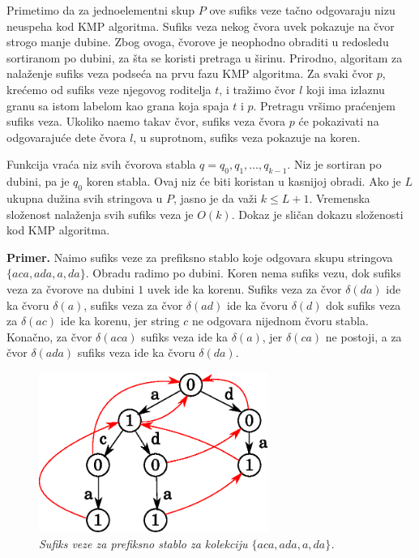 Primetimo da za jednoelementni skup $P$ ove sufiks veze ta\v cno odgovaraju nizu neuspeha kod KMP algoritma. Sufiks veza nekog \v cvora uvek pokazuje na \v cvor strogo manje dubine. Zbog ovoga, \v cvorove je neophodno obraditi u redosledu sortiranom po dubini, za \v sta se koristi pretraga u \v sirinu. Prirodno, algoritam za nala\v zenje sufiks veza podse\' ca na prvu fazu KMP algoritma. Za svaki \v cvor $p$, kre\' cemo od sufiks veze njegovog roditelja $t$, i tra\v zimo \v cvor $l$ koji ima izlaznu granu sa istom labelom kao grana koja spaja $t$ i $p$. Pretragu vr\v simo pra\' cenjem sufiks veza. Ukoliko na\dj emo takav \v cvor, sufiks veza \v cvora $p$ \' ce pokazivati na odgovaraju\' ce dete \v cvora $l$, u suprotnom, sufiks veza pokazuje na koren.

\noindent
\begin{minipage}[l]{\textwidth}

\end{minipage}

Funkcija vra\' ca niz svih \v cvorova stabla $q = q_0, q_1, \ldots, q_{k-1}$. Niz je sortiran po dubini, pa je $q_0$ koren stabla. Ovaj niz \' ce biti koristan u kasnijoj obradi. Ako je $L$ ukupna du\v zina svih stringova u $P$, jasno je da va\v zi $k \leq L+1$. Vremenska slo\v zenost nala\v zenja svih sufiks veza je $O(k)$\cite{ahorad}. Dokaz je sli\v can dokazu slo\v zenosti kod KMP algoritma.

\noindent \textbf{Primer.} Na\dj imo sufiks veze za prefiksno stablo koje odgovara skupu stringova $\{aca,ada,a,da\}$. Obradu radimo po dubini. Koren nema sufiks vezu, dok sufiks veza za \v cvorove na dubini $1$ uvek ide ka korenu. Sufiks veza za \v cvor $\delta(da)$ ide ka \v cvoru $\delta(a)$, sufiks veza za \v cvor $\delta(ad)$ ide ka \v cvoru $\delta(d)$ dok sufiks veza za $\delta(ac)$ ide ka korenu, jer string $c$ ne odgovara nijednom \v cvoru stabla. Kona\v cno, za \v cvor $\delta(aca)$ sufiks veza ide ka $\delta(a)$, jer $\delta(ca)$ ne postoji, a za \v cvor $\delta(ada)$ sufiks veza ide ka \v cvoru $\delta(da)$.

\begin{figure}[H]
    \centering
    \includegraphics[width=75mm]{../img/aho1.eps}
    \caption*{\textit{Sufiks veze za prefiksno stablo za kolekciju $\{aca,ada,a,da\}$.}}
\end{figure}

